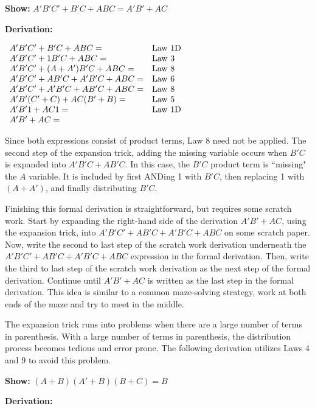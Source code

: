 {\bf Show:} $A'B'C' + B'C + ABC = A'B' + AC$

{\bf Derivation:} 

$\begin{array}[ht]{ll}
A'B'C' + B'C + ABC =		& {\rm Law\ 1D} \\
A'B'C' + 1B'C + ABC = 		& {\rm Law\ 3} \\
A'B'C' + (A+A')B'C + ABC = 	& {\rm Law\ 8} \\
A'B'C' + AB'C +A'B'C + ABC = 	& {\rm Law\ 6} \\
A'B'C' + A'B'C +AB'C + ABC = 	& {\rm Law\ 8} \\
A'B'(C' + C) +AC(B' + B) = 	& {\rm Law\ 5} \\
A'B'1 +AC1 = 			& {\rm Law\ 1D} \\
A'B' +AC = 				&  \\
\end{array}$

Since both expressions consist of product terms, Law 8 need not be applied.
 The second step of the expansion trick,
adding the missing variable occurs when $B'C$ is expanded 
into $A'B'C + AB'C$.  In this case, the $B'C$ product term is 
``missing" the $A$ variable.  It is included by first ANDing 1 
with $B'C$, then replacing 1 with $(A+A')$, and finally
distributing $B'C$.  

Finishing this formal derivation is 
straightforward, but requires some scratch work.  Start by 
expanding the right-hand side of the derivation $A'B' + AC$,
using the expansion trick, into $A'B'C' + AB'C +A'B'C + ABC$ 
on some scratch paper.  Now, 
write the second to last step of the scratch work derivation underneath 
the $A'B'C' + AB'C +A'B'C + ABC$ expression in the formal 
derivation.  Then, write the third to last step of the scratch 
work derivation as the next step of the formal derivation.
Continue until $A'B'+AC$ is written as the last step in
the formal derivation.  This idea is similar to a common maze-solving 
strategy, work at both ends of the maze and try to meet 
in the middle. 

The expansion trick runs into problems when there are a large
number of terms in parenthesis.  With a large number
of terms in parenthesis, the distribution process becomes tedious
and error prone. The following derivation utilizes Laws
4 and 9 to avoid this problem.

{\bf Show:} $(A+B)(A'+B)(B+C) = B$

{\bf Derivation:}

